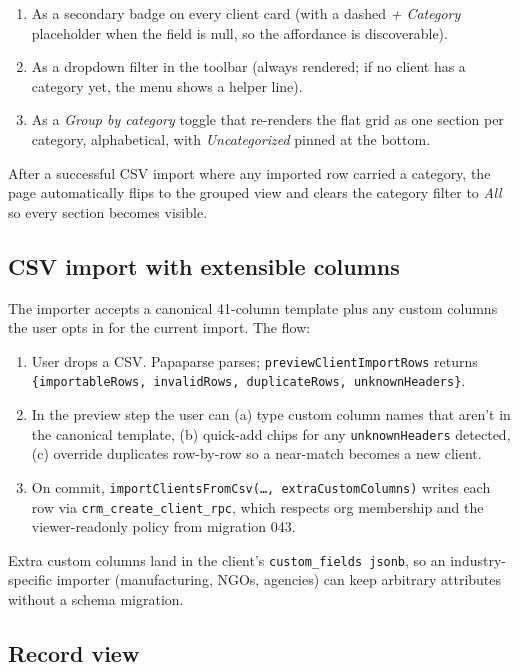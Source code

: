 \documentclass[11pt,a4paper,oneside]{article}
\newcommand{\code}[1]{\texttt{\small #1}}
\begin{document}
\begin{enumerate}
  \item As a secondary badge on every client card (with a dashed
    \emph{+ Category} placeholder when the field is null, so the
    affordance is discoverable).
  \item As a dropdown filter in the toolbar (always rendered; if no
    client has a category yet, the menu shows a helper line).
  \item As a \emph{Group by category} toggle that re-renders the flat
    grid as one section per category, alphabetical, with
    \emph{Uncategorized} pinned at the bottom.
\end{enumerate}

After a successful CSV import where any imported row carried a
category, the page automatically flips to the grouped view and clears
the category filter to \emph{All} so every section becomes visible.

\subsection{CSV import with extensible columns}

The importer accepts a canonical 41-column template plus any custom
columns the user opts in for the current import. The flow:

\begin{enumerate}
  \item User drops a CSV. Papaparse parses; \code{previewClientImportRows}
    returns \code{\{importableRows, invalidRows, duplicateRows,
    unknownHeaders\}}.
  \item In the preview step the user can (a) type custom column names
    that aren't in the canonical template, (b) quick-add chips for any
    \code{unknownHeaders} detected, (c) override duplicates row-by-row
    so a near-match becomes a new client.
  \item On commit, \code{importClientsFromCsv(\dots, extraCustomColumns)}
    writes each row via \code{crm\_create\_client\_rpc}, which respects
    org membership and the viewer-readonly policy from migration 043.
\end{enumerate}

Extra custom columns land in the client's \code{custom\_fields jsonb},
so an industry-specific importer (manufacturing, NGOs, agencies) can
keep arbitrary attributes without a schema migration.

\subsection{Record view}
\end{document}
